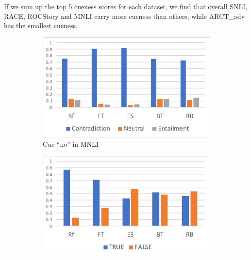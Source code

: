 If we sum up the top 5 cueness scores for each dataset, we find that
overall SNLI, RACE, ROCStory and MNLI carry more cueness than others,
while ARCT\_adv has the smallest cueness. 

\begin{figure}[th]
\centering
\begin{subfigure}[b]{0.3\textwidth}
\centering
\includegraphics[width=\columnwidth]{picture/no_mnli.eps}
\caption{Cue ``no'' in MNLI}
\label{fig:cue_no}
\end{subfigure}
\hfill
\begin{subfigure}[b]{0.3\textwidth}
\centering
\includegraphics[width=\columnwidth]{picture/above_arct.eps}

\end{subfigure}
\end{figure}
